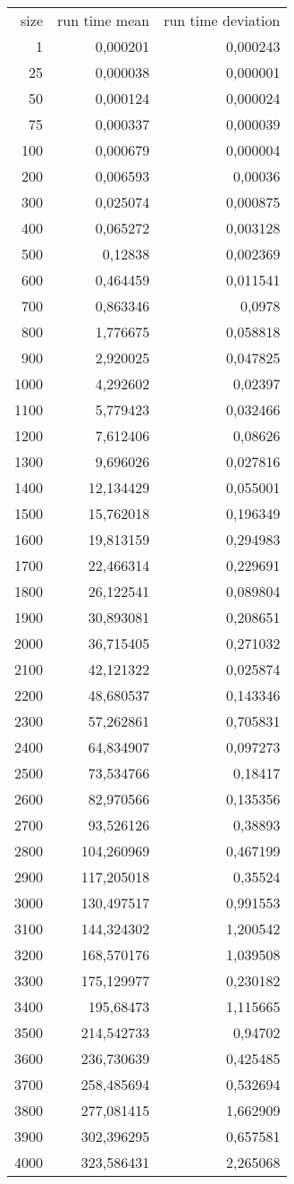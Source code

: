 \begin{tabular}{r r r}
size & run time mean & run time deviation \\
1 & 0,000201 & 0,000243 \\
25 & 0,000038 & 0,000001 \\
50 & 0,000124 & 0,000024 \\
75 & 0,000337 & 0,000039 \\
100 & 0,000679 & 0,000004 \\
200 & 0,006593 & 0,00036 \\
300 & 0,025074 & 0,000875 \\
400 & 0,065272 & 0,003128 \\
500 & 0,12838 & 0,002369 \\
600 & 0,464459 & 0,011541 \\
700 & 0,863346 & 0,0978 \\
800 & 1,776675 & 0,058818 \\
900 & 2,920025 & 0,047825 \\
1000 & 4,292602 & 0,02397 \\
1100 & 5,779423 & 0,032466 \\
1200 & 7,612406 & 0,08626 \\
1300 & 9,696026 & 0,027816 \\
1400 & 12,134429 & 0,055001 \\
1500 & 15,762018 & 0,196349 \\
1600 & 19,813159 & 0,294983 \\
1700 & 22,466314 & 0,229691 \\
1800 & 26,122541 & 0,089804 \\
1900 & 30,893081 & 0,208651 \\
2000 & 36,715405 & 0,271032 \\
2100 & 42,121322 & 0,025874 \\
2200 & 48,680537 & 0,143346 \\
2300 & 57,262861 & 0,705831 \\
2400 & 64,834907 & 0,097273 \\
2500 & 73,534766 & 0,18417 \\
2600 & 82,970566 & 0,135356 \\
2700 & 93,526126 & 0,38893 \\
2800 & 104,260969 & 0,467199 \\
2900 & 117,205018 & 0,35524 \\
3000 & 130,497517 & 0,991553 \\
3100 & 144,324302 & 1,200542 \\
3200 & 168,570176 & 1,039508 \\
3300 & 175,129977 & 0,230182 \\
3400 & 195,68473 & 1,115665 \\
3500 & 214,542733 & 0,94702 \\
3600 & 236,730639 & 0,425485 \\
3700 & 258,485694 & 0,532694 \\
3800 & 277,081415 & 1,662909 \\
3900 & 302,396295 & 0,657581 \\
4000 & 323,586431 & 2,265068 \\
\end{tabular}

